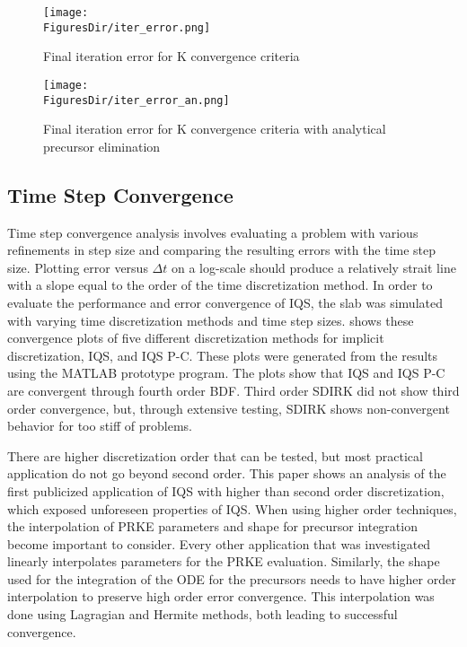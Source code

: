 \begin{figure}[!htbp]
\centering
\texttt{[image: \\FiguresDir/iter\_error.png]}
\caption{Final iteration error for K convergence criteria}
\label{fig:iter_err}
\end{figure}

\begin{figure}[!htbp]
\centering
\texttt{[image: \\FiguresDir/iter\_error\_an.png]}
\caption{Final iteration error for K convergence criteria with analytical precursor elimination}
\label{fig:iter_err_an}
\end{figure}


\subsection{Time Step Convergence}

Time step convergence analysis involves evaluating a problem with various refinements in step size and comparing the resulting errors with the time step size. Plotting error versus $\Delta t$ on a log-scale should produce a relatively strait line with a slope equal to the order of the time discretization method. In order to evaluate the performance and error convergence of IQS, the slab was simulated with varying time discretization methods and time step sizes.   shows these convergence plots of five different discretization methods for implicit discretization, IQS, and IQS P-C.  These plots were generated from the results using the MATLAB prototype program.  The plots show that IQS and IQS P-C are convergent through fourth order BDF.  Third order SDIRK did not show third order convergence, but, through extensive testing, SDIRK shows non-convergent behavior for too stiff of problems.  

There are higher discretization order that can be tested, but most practical application do not go beyond second order.  This paper shows an analysis of the first publicized application of IQS with higher than second order discretization, which exposed unforeseen properties of IQS.  When using higher order techniques, the interpolation of PRKE parameters and shape for precursor integration become important to consider.  Every other application that was investigated linearly interpolates parameters for the PRKE evaluation.  Similarly, the shape used for the integration of the ODE for the precursors needs to have higher order interpolation to preserve high order error convergence.  This interpolation was done using Lagragian and Hermite methods, both leading to successful convergence.

